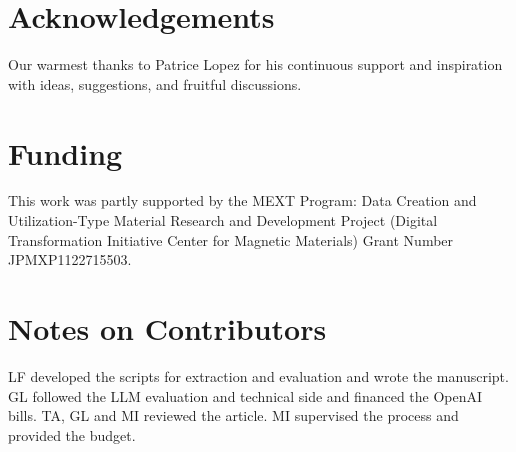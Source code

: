 \documentclass[a4paper]{article}
\begin{document}
\section*{Acknowledgements}
Our warmest thanks to Patrice Lopez for his continuous support and inspiration with ideas, suggestions, and fruitful discussions.


\section*{Funding}
This work was partly supported by the MEXT Program: Data Creation and Utilization-Type Material Research and Development Project (Digital Transformation Initiative Center for Magnetic Materials) Grant Number JPMXP1122715503.


\section*{Notes on Contributors}
LF developed the scripts for extraction and evaluation and wrote the manuscript.
GL followed the LLM evaluation and technical side and financed the OpenAI bills. 
TA, GL and MI reviewed the article.
MI supervised the process and provided the budget. 






\clearpage

\appendix

\end{document}
